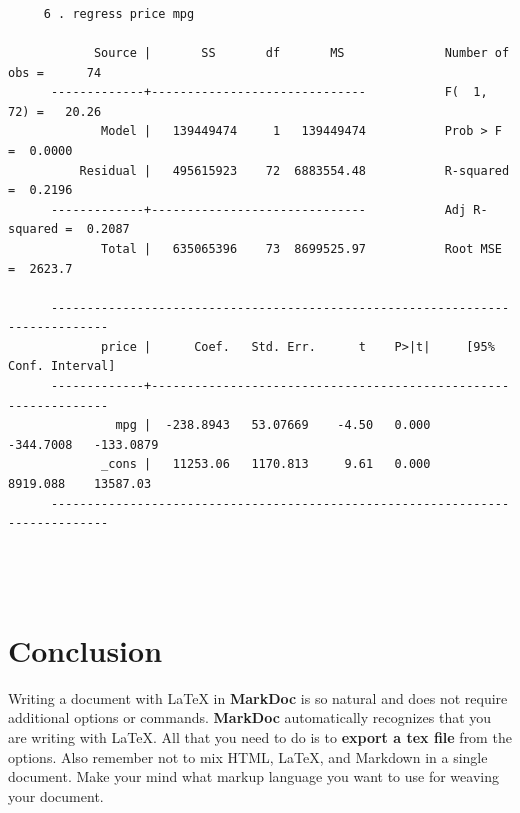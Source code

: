 \documentclass{article}
\begin{document}
\begin{verbatim}
      
      

     6 . regress price mpg
      
            Source |       SS       df       MS              Number of obs =      74
      -------------+------------------------------           F(  1,    72) =   20.26
             Model |   139449474     1   139449474           Prob > F      =  0.0000
          Residual |   495615923    72  6883554.48           R-squared     =  0.2196
      -------------+------------------------------           Adj R-squared =  0.2087
             Total |   635065396    73  8699525.97           Root MSE      =  2623.7
      
      ------------------------------------------------------------------------------
             price |      Coef.   Std. Err.      t    P>|t|     [95% Conf. Interval]
      -------------+----------------------------------------------------------------
               mpg |  -238.8943   53.07669    -4.50   0.000    -344.7008   -133.0879
             _cons |   11253.06   1170.813     9.61   0.000     8919.088    13587.03
      ------------------------------------------------------------------------------
      
      


\end{verbatim}

\section{Conclusion}
Writing a document with \LaTeX{} in \textbf{MarkDoc} is so natural and 
does not require additional options or commands. \textbf{MarkDoc} 
automatically recognizes that you are writing with \LaTeX{}. All that 
you need to do is to \textbf{export a tex file} from the options. Also 
remember not to mix HTML, \LaTeX{}, and Markdown in a single document. 
Make your mind what markup language you want to use for weaving your 
document. 
\end{document}
